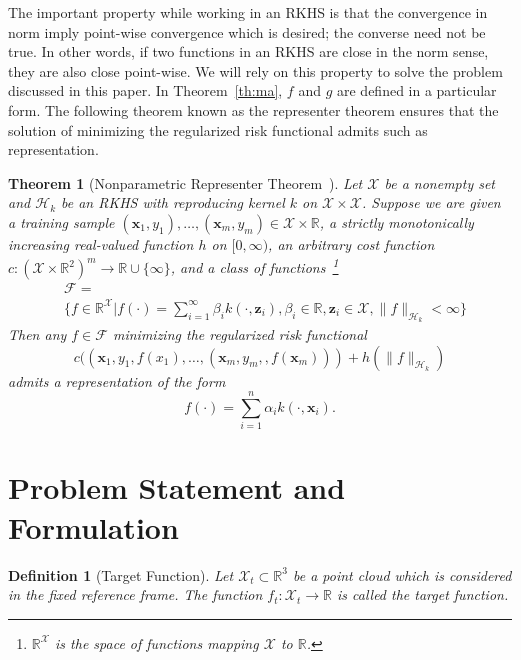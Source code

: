 \documentclass[conference]{IEEEtran}
\newtheorem{theorem}{Theorem}
\newtheorem{definition}{Definition}
\newcommand{\Fcal}{\mathcal{F}}
\newcommand{\Hcal}{\mathcal{H}}
\newcommand{\Xcal}{\mathcal{X}}
\begin{document}
The important property while working in an RKHS is that the convergence in norm imply point-wise convergence which is desired; the converse need not be true. In other words, if two functions in an RKHS are close in the norm sense, they are also close point-wise. We will rely on this property to solve the problem discussed in this paper. In Theorem~\ref{th:ma}, $f$ and $g$ are defined in a particular form. The following theorem known as the representer theorem ensures that the solution of minimizing the regularized risk functional admits such as representation.

\begin{theorem}[Nonparametric Representer Theorem~\citep{scholkopf2001generalized}]
Let $\Xcal$ be a nonempty set and $\Hcal_k$ be an RKHS with reproducing kernel $k$ on $\Xcal \times \Xcal$. Suppose we are given a training sample $(\mathbf{x}_1,y_1),\dots,(\mathbf{x}_m,y_m) \in \Xcal \times \mathbb{R}$, a strictly monotonically increasing real-valued function $h$ on $[0, \infty)$, an arbitrary cost function $c:(\Xcal \times \mathbb{R}^2)^m \to \mathbb{R} \cup \{\infty\}$, and a class of functions~\footnote{$\mathbb{R}^{\Xcal}$ is the space of functions mapping $\Xcal$ to $\mathbb{R}$.}
\begin{align}
	\nonumber &\Fcal = \\
    &\{f \in \mathbb{R}^{\Xcal} | f(\cdot) = \sum_{i=1}^\infty \beta_i k(\cdot, \mathbf{z}_i), \beta_i \in \mathbb{R}, \mathbf{z}_i \in \Xcal, \lVert f \rVert_{\Hcal_k} < \infty \}
\end{align}
Then any $f \in \Fcal$ minimizing the regularized risk functional 
\begin{equation}
	c((\mathbf{x}_1,y_1,f(x_1),\dots,(\mathbf{x}_m,y_m,,f(\mathbf{x}_m))) + h(\lVert f \rVert_{\Hcal_k})
\end{equation}
admits a representation of the form
\begin{equation}
	f(\cdot) =  \sum_{i=1}^n \alpha_i k(\cdot, \mathbf{x}_i).
\end{equation}
\end{theorem}




\section{Problem Statement and Formulation}
\label{sec:statement}


\begin{definition}[Target Function]
 Let $\Xcal_t \subset \mathbb{R}^3$ be a point cloud which is considered in the fixed reference frame. The function \mbox{$f_t:\Xcal_t \to \mathbb{R}$} is called the target function.
\end{definition}
\end{document}
